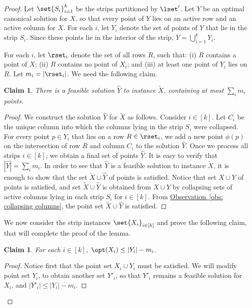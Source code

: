 \documentclass[11pt]{article}
\numberwithin{equation}{section}
\newtheorem{claim}[theorem]{Claim}
\theoremstyle{definition}
\theoremstyle{plain}
\newcommand{\expref}[2]{\hyperref[#2]{#1~\ref{#2}}}
\begin{document}
\begin{proof}        

Let $\set{S_i}_{i=1}^k$ be the strips partitioned by $\lset'$. 
Let $Y$ be an optimal canonical solution for $X$, so that every point of $Y$ lies on an active row and an active column for $X$. For each $i$, let $Y_i$ denote the set of points of $Y$ that lie in the strip $S_i$. Since these points  lie in the interior of the strip,  $Y = \bigcup_{i=1}^k Y_i$. 
        
        
        For each $i$, let $\rset_i$ denote the set of all rows $R$, such that: (i) $R$ contains a point of $X$; (ii) $R$ contains no point of $X_i$; and (iii) at least one point of $Y_i$ lies on $R$. Let $m_i=|\rset_i|$.
      We need the following claim.
         
        \begin{claim}
                There is a feasible solution $\hat{Y}$ to instance $\tilde{X}$, containing at most $\sum_{i} m_i$ points. 
        \end{claim}
        \begin{proof}
                We construct the solution $\hat{Y}$ for $\tilde{X}$ as follows. 
                Consider $i \in [k]$. Let $C_i$ be the unique column into which the columns lying in the strip $S_i$ were collapsed. For every point $p\in Y_i$ that lies on a row $R\in\rset_i$, we add a new point $\phi(p)$ on the intersection of row $R$ and column $C_i$ to the solution $\hat Y$. Once we process all strips $i \in [k]$, we obtain a final set of points $\hat Y$. It is easy to verify that  $|\hat{Y}| = \sum_i m_i$. 
In order to see that $\hat Y$ is a feasible solution to instance $\tilde{X}$, it is enough to show that the set $\tilde{X}\cup \hat Y$ of points is satisfied. 
Notice that set $X\cup Y$ of points is satisfied, and set $\tilde{X}\cup \hat Y$ is obtained from $X\cup Y$ by collapsing sets of active columns lying in each strip $S_i$ for $i \in [k]$. 
From \expref{Observation}{obs: collapsing columns}, the point set $\tilde{X}\cup \hat Y$ is satisfied.  
\end{proof}
        
        We now consider the strip instances $\set{X_i}_{i\in [k]}$ and prove the following claim, that will complete the proof of the lemma. 
        
        \begin{claim}\label{claim:opt y-m}
                For each $i \in [k]$, $\opt(X_i) \leq |Y_i| - m_i$. 
        \end{claim}
       \begin{proof}
                Notice first that the point set $X_i \cup Y_i$ must be satisfied. 
                We will modify point set $Y_i$, to obtain another set $Y'_i$, so that $Y'_i$ remains a feasible solution for $X_i$, and $|Y'_i| \le |Y_i| - m_i$.
                

\end{proof}
\end{proof}
\end{document}
